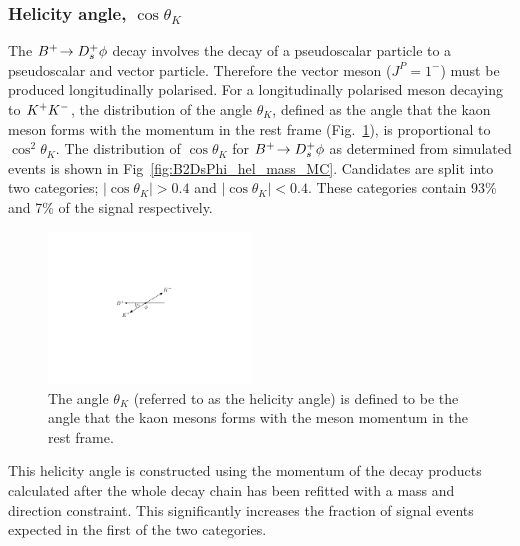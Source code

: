 


\subsubsection{Helicity angle, $\cos\theta_{K}$} 

The ${{{B}^+}}\!\rightarrow {\ensuremath{{D}^+_{s}}}\phi$ decay involves the decay of a pseudoscalar particle to a pseudoscalar and vector particle. Therefore the \phiz vector meson ($J^{P} = 1^{-}$) must be produced longitudinally polarised. For a longitudinally polarised \phiz meson decaying to ${{K}^+}{{K}^-}$, the distribution of the angle $\theta_{K}$, defined as the angle that the kaon meson forms with the \Bp momentum in the \phiz rest frame (Fig.~\ref{fig:B2DsPhi_helicity_angle}), is proportional to $\cos^{2}{\theta_{K}}$. The distribution of $\cos{\theta_{K}}$ for ${{{B}^+}}\!\rightarrow {\ensuremath{{D}^+_{s}}}\phi$ as determined from simulated events is shown in Fig~\ref{fig:B2DsPhi_hel_mass_MC}. Candidates are split into two categories; $|\cos{\theta_{K}} |> 0.4$ and $|\cos{\theta_{K}} |< 0.4$. These categories contain 93\% and 7\% of the signal respectively.
\begin{figure}[!h]
    \centering
    \includegraphics[width=0.48\textwidth]{figs/B2DsPhi/helicityangle.pdf}
    \caption{The angle $\theta_{K}$ (referred to as the helicity angle) is defined to be the angle that the kaon mesons forms with the \Bp meson momentum in the \phiz rest frame.}
    \label{fig:B2DsPhi_helicity_angle}   
\end{figure}

This helicity angle is constructed using the momentum of the decay products calculated after the whole decay chain has been refitted with a \Dsp mass and \Bp direction constraint. This significantly increases the fraction of signal events expected in the first of the two categories.


